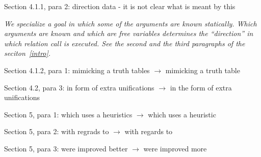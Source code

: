 Section 4.1.1, para 2: direction data - it is not clear what is meant by this

\emph{We specialize a \mk goal in which some of the arguments are known statically. Which arguments are known and which are free variables determines the ``direction'' in which relation call is executed. See the second and the third paragraphs of the seciton~\ref{intro}. }

Section 4.1.2, para 1: mimicking a truth tables $\to$ mimicking a truth table

Section 4.2, para 3: in form of extra unifications $\to$ in the form of extra unifications

Section 5, para 1: which uses a heuristics $\to$ which uses a heuristic

Section 5, para 2: with regrads to $\to$ with regards to

Section 5, para 3: were improved better $\to$ were improved more

